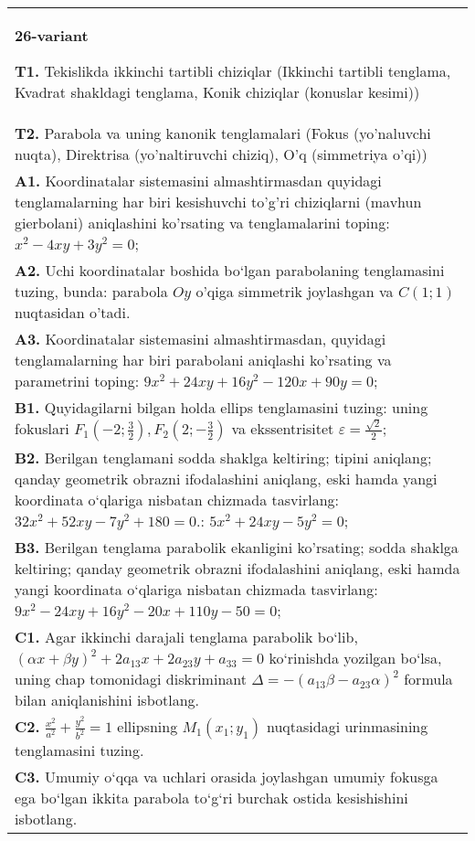 \documentclass{article}
\begin{document}
\begin{tabular}{m{17cm}}
\textbf{26-variant}
\newline

\textbf{T1.} Tekislikda ikkinchi tartibli chiziqlar (Ikkinchi tartibli tenglama, Kvadrat shakldagi tenglama, Konik chiziqlar (konuslar kesimi)) \\
\textbf{T2.} Parabola va uning kanonik tenglamalari (Fokus (yo’naluvchi nuqta), Direktrisa (yo’naltiruvchi chiziq), O’q (simmetriya o’qi)) \\
\textbf{A1.} Koordinatalar sistemasini almashtirmasdan quyidagi tenglamalarning har biri kesishuvchi to'g'ri chiziqlarni (mavhun gierbolani) aniqlashini ko'rsating va tenglamalarini toping: $x^2-4 x y+3 y^2=0$; \\
\textbf{A2.} Uchi koordinatalar boshida bo‘lgan parabolaning tenglamasini tuzing, bunda: parabola $Oy$ o'qiga simmetrik joylashgan va $C(1 ; 1)$ nuqtasidan o’tadi. \\
\textbf{A3.} Koordinatalar sistemasini almashtirmasdan, quyidagi tenglamalarning har biri parabolani aniqlashi ko'rsating va parametrini toping: $9 x^2+24 x y+16 y^2-120 x+90 y=0$; \\
\textbf{B1.} Quyidagilarni bilgan holda ellips tenglamasini tuzing: uning fokuslari $F_1\left(-2; \frac{3}{2}\right), F_2\left(2;-\frac{3}{2}\right) $ va ekssentrisitet $\varepsilon=\frac{\sqrt{2}}{2}$; \\
\textbf{B2.} Berilgan tenglamani sodda shaklga keltiring; tipini aniqlang; qanday geometrik obrazni ifodalashini aniqlang, eski hamda yangi koordinata o‘qlariga nisbatan chizmada tasvirlang: $32x^2+52xy-7y^2+180=0$.: $5 x^2+24 x y-5 y^2=0$; \\
\textbf{B3.} Berilgan tenglama parabolik ekanligini ko'rsating; sodda shaklga keltiring; qanday geometrik obrazni ifodalashini aniqlang, eski hamda yangi koordinata o‘qlariga nisbatan chizmada tasvirlang: $9 x^2-24 x y+16 y^2-20 x+110 y-50=0$; \\
\textbf{C1.} Agar ikkinchi darajali tenglama parabolik bo‘lib, $ (\alpha x+\beta y) ^2+2a_{13}x+2a_{23}y+a_{33}=0$ ko‘rinishda yozilgan bo‘lsa, uning chap tomonidagi diskriminant $\Delta=- (a_{13} \beta-a_{23} \alpha) ^2$ formula bilan aniqlanishini isbotlang. \\
\textbf{C2.} $\frac{x^2}{a^2}+\frac{y^2}{b^2}=1$ ellipsning $M_1(x_1; y_1)$ nuqtasidagi urinmasining tenglamasini tuzing. \\
\textbf{C3.} Umumiy o‘qqa va uchlari orasida joylashgan umumiy fokusga ega bo‘lgan ikkita parabola to‘g‘ri burchak ostida kesishishini isbotlang. \\

\end{tabular}
\vspace{1cm}
\end{document}
